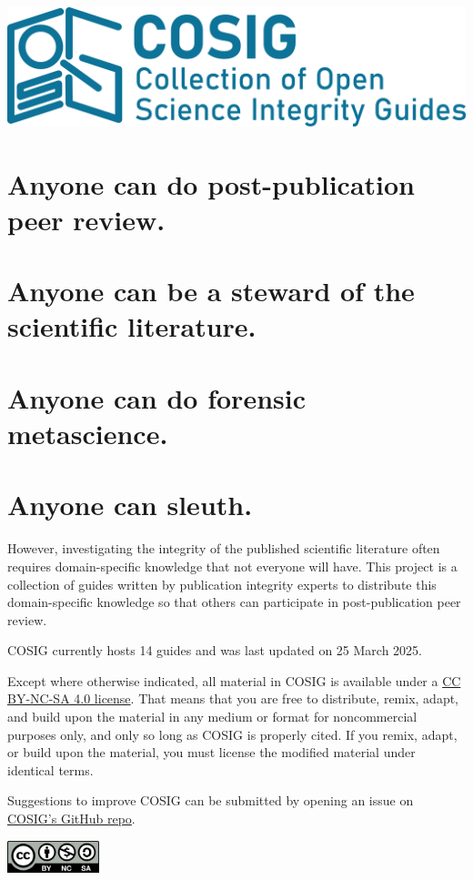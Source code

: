 \documentclass[letterpaper, 12pt]{article}
\begin{document}
\flushleft
\includegraphics[width=\textwidth]{img/home/241017_final_logo_mockup.png}

\section*{Anyone can do post-publication peer review.}
\section*{Anyone can be a steward of the scientific literature.}
\section*{Anyone can do forensic metascience.}
\section*{Anyone can sleuth.}

However, investigating the integrity of the published scientific literature often requires domain-specific knowledge that not everyone will have. This project is a collection of guides written by publication integrity experts to distribute this domain-specific knowledge so that others can participate in post-publication peer review.

COSIG currently hosts 14 guides and was last updated on 25 March 2025.

Except where otherwise indicated, all material in COSIG is available under a \href{https://creativecommons.org/licenses/by-nc-sa/4.0/deed.en}{CC BY-NC-SA 4.0 license}. That means that you are free to distribute, remix, adapt, and build upon the material in any medium or format for noncommercial purposes only, and only so long as COSIG is properly cited. If you remix, adapt, or build upon the material, you must license the modified material under identical terms.

Suggestions to improve COSIG can be submitted by opening an issue on \href{https://github.com/reeserich/cosig/issues}{COSIG's GitHub repo}.

\includegraphics[width=0.2\textwidth]{img/home/Cc-by-nc-sa_icon.svg.png}
\end{document}

